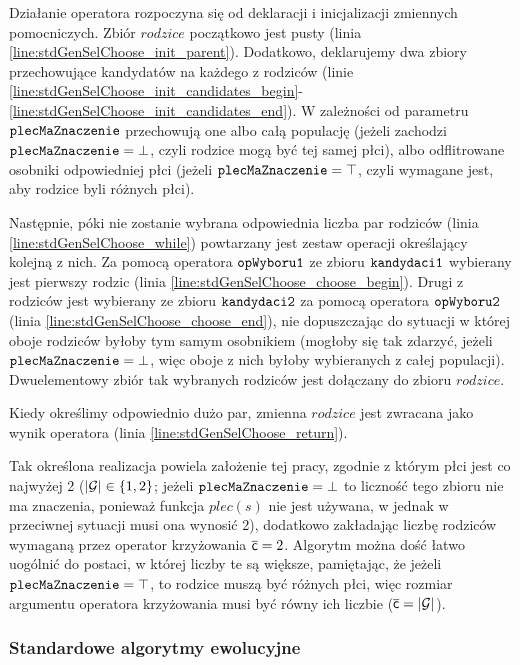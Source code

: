 \documentclass[./FM_mgr.tex]{subfiles}
\begin{document}
Działanie operatora rozpoczyna się od deklaracji i inicjalizacji zmiennych pomocniczych.
Zbiór $rodzice$ początkowo jest pusty (linia \ref{line:stdGenSelChoose_init_parent}).
Dodatkowo, deklarujemy dwa zbiory przechowujące kandydatów na każdego z rodziców (linie \ref{line:stdGenSelChoose_init_candidates_begin}-\ref{line:stdGenSelChoose_init_candidates_end}).
W zależności od parametru $\mathtt{plecMaZnaczenie}$ przechowują one albo całą populację (jeżeli zachodzi $\mathtt{plecMaZnaczenie} = \bot$, czyli rodzice mogą być tej samej płci), albo odflitrowane osobniki odpowiedniej płci (jeżeli $\mathtt{plecMaZnaczenie} = \top$, czyli wymagane jest, aby rodzice byli różnych płci).

Następnie, póki nie zostanie wybrana odpowiednia liczba par rodziców (linia \ref{line:stdGenSelChoose_while}) powtarzany jest zestaw operacji określający kolejną z nich.
Za pomocą operatora $\mathtt{opWyboru1}$ ze zbioru $\mathtt{kandydaci1}$ wybierany jest pierwszy rodzic (linia \ref{line:stdGenSelChoose_choose_begin}).
Drugi z rodziców jest wybierany ze zbioru $\mathtt{kandydaci2}$ za pomocą operatora $\mathtt{opWyboru2}$  (linia \ref{line:stdGenSelChoose_choose_end}), nie dopuszczając do sytuacji w której oboje rodziców byłoby tym samym osobnikiem (mogłoby się tak zdarzyć, jeżeli $\mathtt{plecMaZnaczenie} = \bot$, więc oboje z nich byłoby wybieranych z całej populacji).
Dwuelementowy zbiór tak wybranych rodziców jest dołączany do zbioru $rodzice$.

Kiedy określimy odpowiednio dużo par, zmienna $rodzice$ jest zwracana jako wynik operatora (linia \ref{line:stdGenSelChoose_return}).

Tak określona realizacja powiela założenie tej pracy, zgodnie z którym płci jest co najwyżej 2 ($|\mathcal{G}| \in \{ 1, 2 \}$; jeżeli $\mathtt{plecMaZnaczenie} = \bot$ to liczność tego zbioru nie ma znaczenia, ponieważ funkcja $plec(s)$ nie jest używana, w jednak w przeciwnej sytuacji musi ona wynosić 2), dodatkowo zakładając liczbę rodziców wymaganą przez operator krzyżowania $\mathsf{\overline{c}}=2$.
Algorytm można dość łatwo uogólnić do postaci, w której liczby te są większe, pamiętając, że jeżeli $\mathtt{plecMaZnaczenie} = \top$, to rodzice muszą być różnych płci, więc rozmiar argumentu operatora krzyżowania musi być równy ich liczbie ($\mathsf{\overline{c}} = |\mathcal{G}|$).

\subsubsection{Standardowe algorytmy ewolucyjne}
\end{document}

